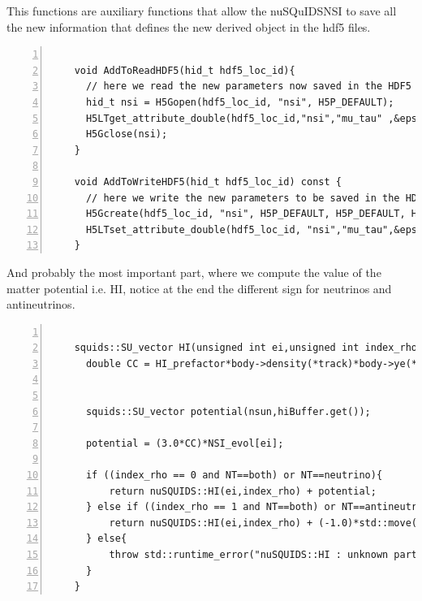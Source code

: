 This functions are auxiliary functions that allow the nuSQuIDSNSI to
save all the new information that defines the new derived object in
the hdf5 files.

\begin{lstlisting}[frame=leftline, numbers =
  left,breaklines=true,label = ex:sin1,firstnumber=last]

    void AddToReadHDF5(hid_t hdf5_loc_id){
      // here we read the new parameters now saved in the HDF5 file
      hid_t nsi = H5Gopen(hdf5_loc_id, "nsi", H5P_DEFAULT);
      H5LTget_attribute_double(hdf5_loc_id,"nsi","mu_tau" ,&epsilon_mutau);
      H5Gclose(nsi);
    }

    void AddToWriteHDF5(hid_t hdf5_loc_id) const {
      // here we write the new parameters to be saved in the HDF5 file
      H5Gcreate(hdf5_loc_id, "nsi", H5P_DEFAULT, H5P_DEFAULT, H5P_DEFAULT);
      H5LTset_attribute_double(hdf5_loc_id, "nsi","mu_tau",&epsilon_mutau, 1);
    }

\end{lstlisting}

And probably the most important part, where we compute the value of
the matter potential i.e. {\ttf HI}, notice at the end the different
sign for neutrinos and antineutrinos.
\begin{lstlisting}[frame=leftline, numbers =
  left,breaklines=true,label = ex:sin1,firstnumber=last]

    squids::SU_vector HI(unsigned int ei,unsigned int index_rho) const{
      double CC = HI_prefactor*body->density(*track)*body->ye(*track);


      squids::SU_vector potential(nsun,hiBuffer.get());

      potential = (3.0*CC)*NSI_evol[ei];

      if ((index_rho == 0 and NT==both) or NT==neutrino){
          return nuSQUIDS::HI(ei,index_rho) + potential;
      } else if ((index_rho == 1 and NT==both) or NT==antineutrino){
          return nuSQUIDS::HI(ei,index_rho) + (-1.0)*std::move(potential);
      } else{
          throw std::runtime_error("nuSQUIDS::HI : unknown particle or antiparticle");
      }
    }

\end{lstlisting}

